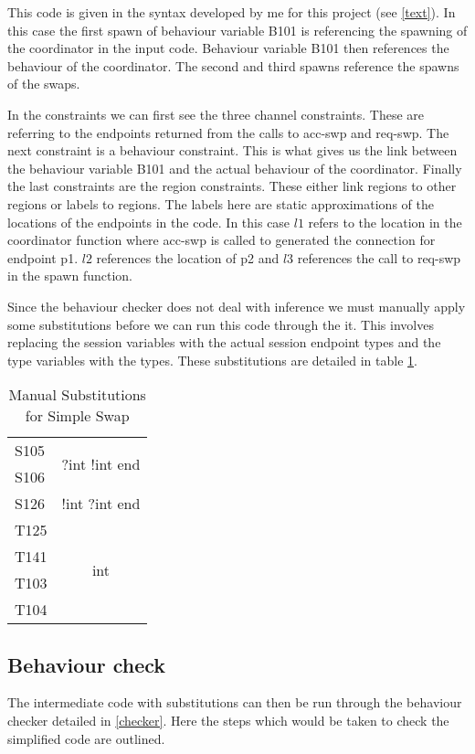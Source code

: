 This code is given in the syntax developed by me for this project (see \ref{text}). In this case the first spawn of behaviour variable B101 is referencing the spawning of the coordinator in the input code. Behaviour variable B101 then references the behaviour of the coordinator. The second and third spawns reference the spawns of the swaps. 

In the constraints we can first see the three channel constraints. These are referring to the endpoints returned from the calls to acc-swp and req-swp. The next constraint is a behaviour constraint. This is what gives us the link between the behaviour variable B101 and the actual behaviour of the coordinator. Finally the last constraints are the region constraints. These either link regions to other regions or labels to regions. The labels here are static approximations of the locations of the endpoints in the code. In this case $l1$ refers to the location in the coordinator function where acc-swp is called to generated the connection for endpoint p1. $l2$ references the location of p2 and $l3$ references the call to req-swp in the spawn function. 

Since the behaviour checker does not deal with inference we must manually apply some substitutions before we can run this code through the it. This involves replacing the session variables with the actual session endpoint types and the type variables with the types. These substitutions are detailed in table \ref{subs}. 

\begin{table}
\centering
\begin{tabular}{l |c}
S105 & \multirow{2}{*}{?int !int end} \\
S106 & \\ \hline
S126 & !int ?int end \\ \hline
T125 & \multirow{4}{*}{int} \\
T141 & \\ 
T103 & \\
T104 & \\ 
\end{tabular}
\caption{Manual Substitutions for Simple Swap}
\label{subs}
\end{table}

\subsection{Behaviour check}

The intermediate code with substitutions can then be run through the behaviour checker detailed in \ref{checker}. Here the steps which would be taken to check the simplified code are outlined. 

